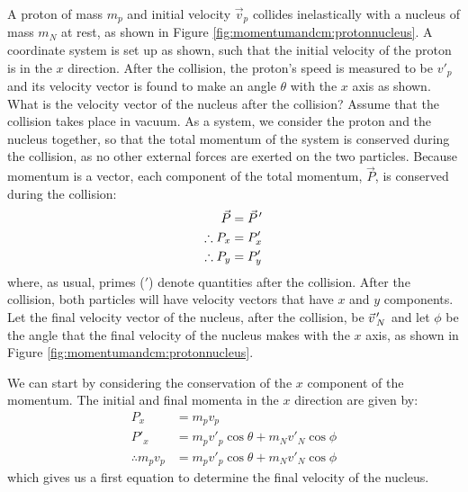 \begin{example}{
A proton of mass $m_p$ and initial velocity $\vec v_p$ collides inelastically with a nucleus of mass $m_N$ at rest, as shown in Figure \ref{fig:momentumandcm:protonnucleus}. A coordinate system is set up as shown, such that the initial velocity of the proton is in the $x$ direction. After the collision, the proton's speed is measured to be $v'_p$ and its velocity vector is found to make an angle $\theta$ with the $x$ axis as shown. What is the velocity vector of the nucleus after the collision? Assume that the collision takes place in vacuum.}
As a system, we consider the proton and the nucleus together, so that the total momentum of the system is conserved during the collision, as no other external forces are exerted on the two particles. Because momentum is a vector, each component of the total momentum, $\vec P$, is conserved during the collision:
\begin{align*}
\vec P &= \pvec P'\\
\therefore P_x &= P'_x\\
\therefore P_y &= P'_y
\end{align*}
where, as usual, primes ($'$) denote quantities after the collision. After the collision, both particles will have velocity vectors that have $x$ and $y$ components. Let the final velocity vector of the nucleus, after the collision, be $\pvec v'_N$ and let $\phi$ be the angle that the final velocity of the nucleus makes with the $x$ axis, as shown in Figure \ref{fig:momentumandcm:protonnucleus}. 

We can start by considering the conservation of the $x$ component of the momentum. The initial and final momenta in the $x$ direction are given by:
\begin{align*}
P_x &= m_p v_p\\
P'_x &= m_p v'_p\cos\theta + m_N v'_N\cos\phi\\
\therefore m_p v_p &= m_p v'_p\cos\theta + m_N v'_N\cos\phi
\end{align*}
which gives us a first equation to determine the final velocity of the nucleus.


\end{example}
